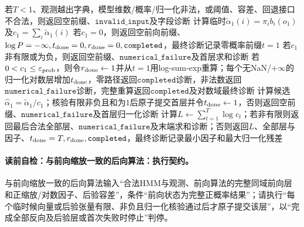 \begin{AlgorithmContract}
\begin{algorithm}[H]
若$T<1$、观测越出字典，模型维数/概率/归一化非法，或阈值、容差、回退接口不合法，则返回空前缀、$\mathtt{invalid\_input}$及字段诊断\;
计算临时$\widetilde\alpha_1(i)=\pi_i b_i(o_1)$及$c_1=\sum_i\widetilde\alpha_1(i)$\;
若$c_1=0$，则返回空前向前缀、$\log P=-\infty,t_{\rm done}=0,r_{\rm done}=0,\mathtt{completed}$，最终诊断记录零概率前缀$t=1$\;
若$c_1$非有限或为负，则返回空前缀、$\mathtt{numerical\_failure}$及首层求和诊断\;
若$0<c_1\le\varepsilon_{\rm prob}$，则令$r_{\rm done}\leftarrow1$并从$t=1$用log-sum-exp重算；每个无NaN/$+\infty$的归一化对数层增加$t_{\rm done}$，零路径返回$\mathtt{completed}$诊断，非法数返回$\mathtt{numerical\_failure}$诊断，完整重算返回$\mathtt{completed}$及对数域最终诊断\;
计算候选$\widehat\alpha_1=\widetilde\alpha_1/c_1$；核验有限非负且和为$1$后原子提交首层并令$t_{\rm done}\leftarrow1$，否则返回空前缀、$\mathtt{numerical\_failure}$及首层归一化诊断\;
计算$L\leftarrow\sum_{t=1}^T\log c_t$；若非有限则返回最后合法全部层、$\mathtt{numerical\_failure}$及末端求和诊断；否则返回$L$、全部层与因子、$t_{\rm done}=T,r_{\rm done},\mathtt{completed}$，最终诊断记录最小因子和最大归一化残差\;
\end{algorithm}
\end{AlgorithmContract}

\paragraph{读前自检：与前向缩放一致的后向算法：执行契约。}与前向缩放一致的后向算法输入“合法HMM与观测、前向算法的完整同域前向层和正缩放/对数因子、后验容差”，条件“前向状态为完整正概率结果”；请执行“每个临时候向量或后验张量有限、非负且归一化核验通过后才原子提交该层”，以“完成全部反向及后验层或首次失败时停止”判停。\par
